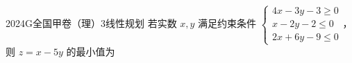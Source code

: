 
\begin{problem}{2024}{G}{全国甲卷（理）}{3}{线性规划}
若实数 $x,y$ 满足约束条件 $\begin{cases} 4x-3y-3\geq 0 \\ x-2y-2\leq 0 \\ 2x+6y-9\leq 0 \end{cases}$，则 $z=x-5y$ 的最小值为
\begin{choices}
\end{choices}
\end{problem}